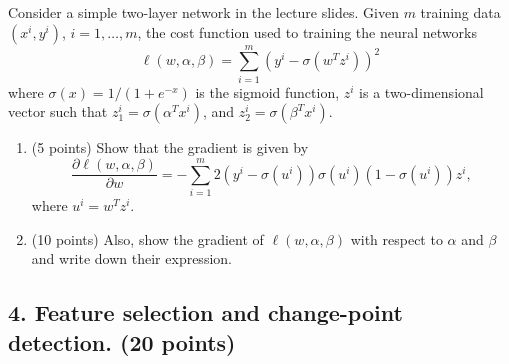 \documentclass[12pt]{article}
\begin{document}
Consider a simple two-layer network in the lecture slides. Given $m$ training data $(x^i, y^i)$, $i = 1, \ldots, m$, the cost function used to training the neural networks
\[
\ell(w, \alpha, \beta) = \sum_{i=1}^m (y^i - \sigma(w^T z^i))^2
\]
where $\sigma (x) = 1/(1+e^{-x})$ is the sigmoid function, $z^i$ is a two-dimensional vector such that  $z_1^i = \sigma(\alpha^T x^i)$, and $z_2^i = \sigma(\beta^T x^i)$. 
\begin{enumerate}
\item (5 points) Show that the gradient is given by
\[
\frac{\partial \ell(w, \alpha, \beta) }{\partial w}
= - \sum_{i=1}^m 2(y^i - \sigma(u^i))\sigma(u^i)(1-\sigma(u^i)) z^i,
\]
where $u^i = w^T z^i$. 
\item (10 points) Also, show the gradient of $\ell(w, \alpha, \beta)$ with respect to $\alpha$ and $\beta$ and write down their expression.
\end{enumerate}


\subsection*{4. Feature selection and change-point detection. (20 points)} 
\end{document}

